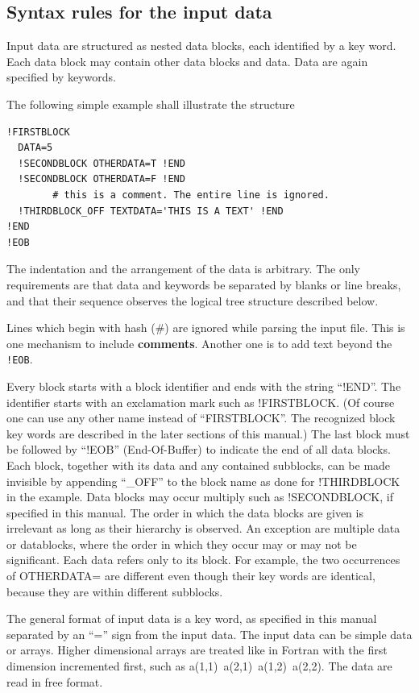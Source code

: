 \documentclass[final,12pt]{article}
\begin{document}
\subsection{Syntax rules for the input data}

Input data are structured as nested data blocks, each identified
by a key word. Each data block may contain other data blocks and
data. Data are again specified by keywords.

The following simple example shall illustrate the structure 
\begin{verbatim}
!FIRSTBLOCK
  DATA=5
  !SECONDBLOCK OTHERDATA=T !END
  !SECONDBLOCK OTHERDATA=F !END
        # this is a comment. The entire line is ignored.
  !THIRDBLOCK_OFF TEXTDATA='THIS IS A TEXT' !END
!END
!EOB
\end{verbatim}
The indentation and the arrangement of the data is arbitrary. The only
requirements are that data and keywords be separated by blanks or
line breaks, and that their sequence observes the logical tree structure
described below.

Lines which begin with hash ($\#$) are ignored while parsing the input
file. This is one mechanism to include
\textbf{comments}. Another one is to add
text beyond the \verb|!EOB|.

Every block starts with a block identifier and ends with the string
``!END''.  The identifier starts with an exclamation mark such as
!FIRSTBLOCK. (Of course one can use any other name instead of
``FIRSTBLOCK''. The recognized block key words are described in the
later sections of this manual.) The last block must be followed by
``!EOB'' (End-Of-Buffer) to indicate the end of all data blocks. Each
block, together with its data and any contained subblocks, can be
made invisible by appending ``\_OFF'' to the block name as done for
!THIRDBLOCK in the example. Data blocks may occur multiply such as
!SECONDBLOCK, if specified in this manual. The order in which the data
blocks are given is irrelevant as long as their hierarchy is observed.
An exception are multiple data or datablocks, where the order in
which they occur may or may not be significant.  Each data refers
only to its block. For example, the two occurrences of OTHERDATA=
are different even though their key words are identical, because they
are within different subblocks.

The general format of input data is a key word, as specified in this
manual separated by an ``='' sign from the input data.  The input data
can be simple data or arrays. Higher dimensional arrays are treated
like in Fortran with the first dimension incremented first, such as
a(1,1)\ a(2,1)\ a(1,2)\ a(2,2). The data are read in free format.
\end{document}
